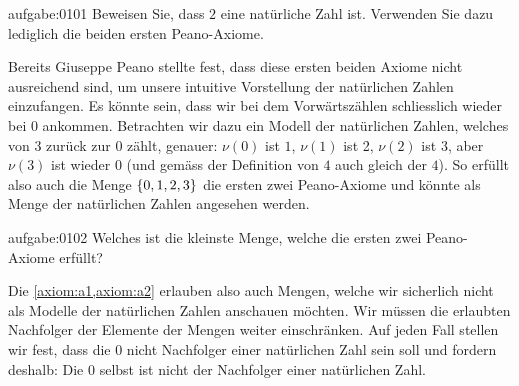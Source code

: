 \begin{aufgabe}{aufgabe:0101}
{Beweisen Sie, dass $2$ eine natürliche Zahl ist. Verwenden Sie dazu lediglich die beiden ersten Peano-Axiome.}
\end{aufgabe}
\noindent
Bereits Giuseppe Peano stellte fest, dass diese ersten beiden Axiome nicht ausreichend sind, um unsere intuitive Vorstellung der natürlichen Zahlen einzufangen. Es könnte sein, dass wir bei dem Vorwärtszählen schliesslich wieder bei $0$ ankommen. Betrachten wir dazu ein Modell der natürlichen Zahlen, welches von $3$ zurück zur $0$ zählt, genauer: $\nu(0)$ ist $1$, $\nu(1)$ ist 2, $\nu(2)$ ist $3$, aber $\nu(3)$ ist wieder $0$ (und gemäss der Definition von $4$ auch gleich der $4$). So erfüllt also auch die Menge $\left\{0,1,2,3\right\}$ die ersten zwei Peano-Axiome und könnte als Menge der natürlichen Zahlen angesehen werden.
\begin{aufgabe}{aufgabe:0102}
{Welches ist die kleinste Menge, welche die ersten zwei Peano-Axiome erfüllt?}
\end{aufgabe}
\noindent
Die \cref{axiom:a1,axiom:a2} erlauben also auch Mengen, welche wir sicherlich nicht als Modelle der natürlichen Zahlen anschauen möchten. Wir müssen die erlaubten Nachfolger der Elemente der Mengen weiter einschränken. Auf jeden Fall stellen wir fest, dass die $0$ nicht Nachfolger einer natürlichen Zahl sein soll und fordern deshalb:
{Die $0$ selbst ist nicht der Nachfolger einer natürlichen Zahl.} %

